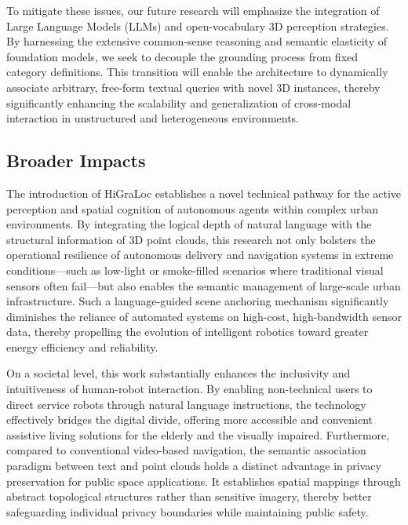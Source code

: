 \documentclass{article}
\begin{document}
To mitigate these issues, our future research will emphasize the integration of Large Language Models (LLMs) and open-vocabulary 3D perception strategies. By harnessing the extensive common-sense reasoning and semantic elasticity of foundation models, we seek to decouple the grounding process from fixed category definitions. This transition will enable the architecture to dynamically associate arbitrary, free-form textual queries with novel 3D instances, thereby significantly enhancing the scalability and generalization of cross-modal interaction in unstructured and heterogeneous environments.

\subsection{Broader Impacts}
The introduction of HiGraLoc establishes a novel technical pathway for the active perception and spatial cognition of autonomous agents within complex urban environments. By integrating the logical depth of natural language with the structural information of 3D point clouds, this research not only bolsters the operational resilience of autonomous delivery and navigation systems in extreme conditions—such as low-light or smoke-filled scenarios where traditional visual sensors often fail—but also enables the semantic management of large-scale urban infrastructure. Such a language-guided scene anchoring mechanism significantly diminishes the reliance of automated systems on high-cost, high-bandwidth sensor data, thereby propelling the evolution of intelligent robotics toward greater energy efficiency and reliability.

On a societal level, this work substantially enhances the inclusivity and intuitiveness of human-robot interaction. By enabling non-technical users to direct service robots through natural language instructions, the technology effectively bridges the digital divide, offering more accessible and convenient assistive living solutions for the elderly and the visually impaired. Furthermore, compared to conventional video-based navigation, the semantic association paradigm between text and point clouds holds a distinct advantage in privacy preservation for public space applications. It establishes spatial mappings through abstract topological structures rather than sensitive imagery, thereby better safeguarding individual privacy boundaries while maintaining public safety.
\newpage

\end{document}
